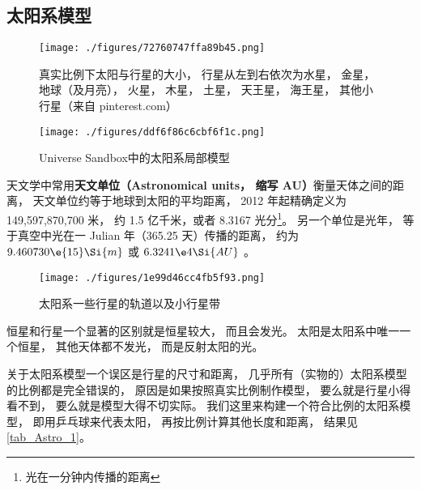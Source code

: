 
\subsection{太阳系模型}

\begin{figure}[ht]
\centering
\texttt{[image: ./figures/72760747ffa89b45.png]}
\caption{真实比例下太阳与行星的大小， 行星从左到右依次为水星， 金星， 地球（及月亮）， 火星， 木星， 土星， 天王星， 海王星， 其他小行星（来自 pinterest.com）} \label{fig_Astro_1}
\end{figure}

\begin{figure}[ht]
\centering
\texttt{[image: ./figures/ddf6f86c6cbf6f1c.png]}
\caption{Universe Sandbox中的太阳系局部模型} \label{fig_Astro_9}
\end{figure}

天文学中常用\textbf{天文单位（Astronomical units， 缩写 AU）}衡量天体之间的距离， 天文单位约等于地球到太阳的平均距离， 2012 年起精确定义为 149,597,870,700 米， 约 1.5 亿千米，或者 8.3167 光分\footnote{光在一分钟内传播的距离}。 另一个单位是光年， 等于真空中光在一 Julian 年（365.25 天）传播的距离， 约为 $9.460730\e{15}\Si{m}$ 或 $6.3241\e4\Si{AU}$ 。

\begin{figure}[ht]
\centering
\texttt{[image: ./figures/1e99d46cc4fb5f93.png]}
\caption{太阳系一些行星的轨道以及小行星带} \label{fig_Astro_3}
\end{figure}

恒星和行星一个显著的区别就是恒星较大， 而且会发光。 太阳是太阳系中唯一一个恒星， 其他天体都不发光， 而是反射太阳的光。

关于太阳系模型一个误区是行星的尺寸和距离， 几乎所有（实物的）太阳系模型的比例都是完全错误的， 原因是如果按照真实比例制作模型， 要么就是行星小得看不到， 要么就是模型大得不切实际。 我们这里来构建一个符合比例的太阳系模型， 即用乒乓球来代表太阳， 再按比例计算其他长度和距离， 结果见\autoref{tab_Astro_1}。

